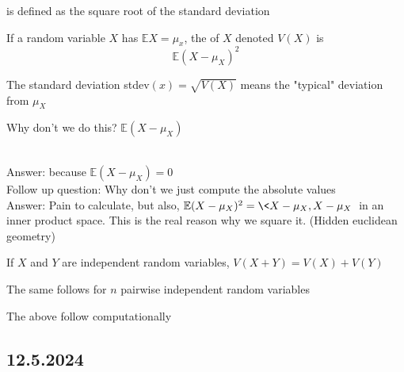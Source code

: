 \documentclass[11pt]{scrartcl}
\begin{document}
\begin{definition}
     is defined as the square root of the standard deviation
\end{definition}

\begin{definition}
    If a random variable $X$ has $\mathbb{E}X = \mu_x$, the  of $X$ denoted $V(X)$ is $$\mathbb{E}(X - \mu_X)^2$$
\end{definition}

\begin{remark}
    The standard deviation stdev$(x) = \sqrt{V(X)}$ means the "typical" deviation from $\mu_X$ 
\end{remark}

\begin{remark}
    Why don't we do this? $\mathbb{E}(X - \mu_X)$
\end{remark}
\\
Answer: because $\mathbb{E}(X - \mu_X) = 0$
\\
Follow up question: Why don't we just compute the absolute values
\\
Answer: Pain to calculate, but also, $\mathbb{E}(X - \mu_X)^2 = \<X-\mu_X, X-\mu_X\>$ in an inner product space. This is the real reason why we square it. (Hidden euclidean geometry)

\begin{theorem}
    If $X$ and $Y$ are independent random variables, $V(X+Y) = V(X) + V(Y)$
\end{theorem}

\begin{corollary}
    The same follows for $n$ pairwise independent random variables
\end{corollary}
The above follow computationally
\newline
\noindent
\Line
\\

\subsection{12.5.2024}
\end{document}
